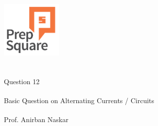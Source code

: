\documentclass{beamer}
\begin{document}
\begin{center}
\ \\ \ \\
\includegraphics[width=30mm]{Logo-final.png} \\
\ \\ \ \\ 
{\huge Question 12 \\ \ \\ }
{\Large
Basic Question on Alternating Currents / Circuits
}
{\large \ \\ \ \\ Prof. Anirban Naskar }
\end{center}
\end{document}
